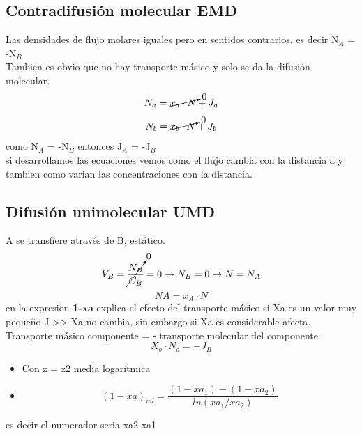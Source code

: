 \documentclass{report}
\begin{document}
\begin{raggedright}
\subsection{Contradifusión molecular EMD}
\begin{raggedright}
	Las densidades de flujo molares iguales pero en sentidos contrarios. es decir N$_A$ = -N$_B$\\
	Tambien es obvio que no hay transporte másico y solo se da la difusión molecular.\\
	\begin{equation*}
		N_a = \cancelto{0}{x_a \cdot N} + J_a
	\end{equation*}
	\begin{equation*}
		N_b = \cancelto{0}{x_b \cdot N} + J_b
	\end{equation*}
como N$_A$ = -N$_B$ entonces J$_A$ = -J$_B$\\
si desarrollamos las ecuaciones vemos como el flujo cambia con la distancia a  y tambien como varian las concentraciones con la distancia.\\
\end{raggedright}
\subsection{Difusión unimolecular UMD}
\begin{raggedright}
	A se transfiere através de B, estático.
	\begin{equation*}
		V_B = \cancelto{0}{\frac{N_B}{C_B}} = 0 \rightarrow N_B = 0 \rightarrow N = N_A
	\end{equation*}
	\begin{equation*}
		NA = x_A \cdot N  %
	\end{equation*}
en la expresion \textbf{1-xa} explica el efecto del transporte másico si Xa es un valor muy pequeño  J  >> Xa no cambia, sin embargo si Xa es considerable afecta.\\
Transporte másico componente = - transporte molecular del componente.
\begin{equation*}
	X_b \cdot N_a = - J_B	
\end{equation*}
\begin{itemize}
	\item [] \begin{center}
		Con z = z2 media logaritmica
	\end{center}
	\item [] \begin{equation*}
		(1-xa)_{ml} = \frac{(1-xa_1)-(1-xa_2)}{ln(xa_1/xa_2)}
	\end{equation*}
\end{itemize}
 es decir  el numerador seria xa2-xa1

\end{raggedright}
\end{raggedright}
\end{document}
